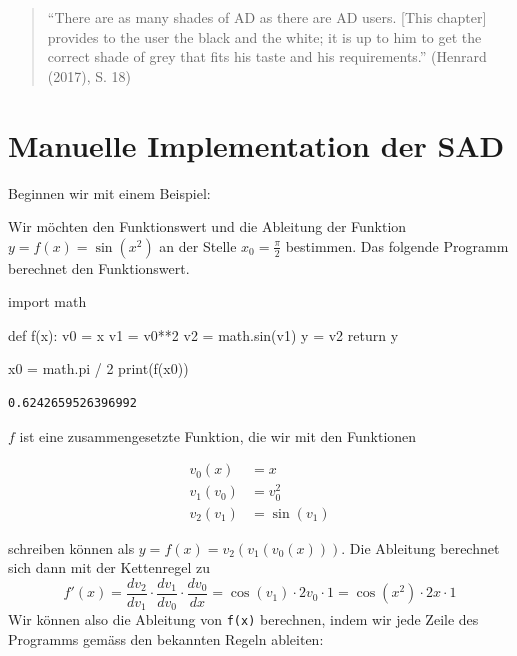 \documentclass[
  a4paper,
  DIV=11]{scrreprt}
\newenvironment{Shaded}{\begin{snugshade}}{\end{snugshade}}
\newcommand{\BuiltInTok}[1]{\textcolor[rgb]{0.00,0.23,0.31}{#1}}
\newcommand{\ControlFlowTok}[1]{\textcolor[rgb]{0.00,0.23,0.31}{#1}}
\newcommand{\DecValTok}[1]{\textcolor[rgb]{0.68,0.00,0.00}{#1}}
\newcommand{\ImportTok}[1]{\textcolor[rgb]{0.00,0.46,0.62}{#1}}
\newcommand{\KeywordTok}[1]{\textcolor[rgb]{0.00,0.23,0.31}{#1}}
\newcommand{\NormalTok}[1]{\textcolor[rgb]{0.00,0.23,0.31}{#1}}
\newcommand{\OperatorTok}[1]{\textcolor[rgb]{0.37,0.37,0.37}{#1}}
\theoremstyle{definition}
\theoremstyle{definition}
\theoremstyle{remark}
\begin{document}
\begin{quote}
``There are as many shades of AD as there are AD users. {[}This
chapter{]} provides to the user the black and the white; it is up to him
to get the correct shade of grey that fits his taste and his
requirements.'' (Henrard (2017), S. 18)
\end{quote}

\hypertarget{sec-SadManualImplementation}{%
\section{Manuelle Implementation der
SAD}\label{sec-SadManualImplementation}}

Beginnen wir mit einem Beispiel:

Wir möchten den Funktionswert und die Ableitung der Funktion
\(y=f(x)=\sin(x^2)\) an der Stelle \(x_0=\frac{\pi}{2}\) bestimmen. Das
folgende Programm berechnet den Funktionswert.

\begin{Shaded}
\begin{Highlighting}[]
\ImportTok{import}\NormalTok{ math}

\KeywordTok{def}\NormalTok{ f(x):}
\NormalTok{    v0 }\OperatorTok{=}\NormalTok{ x}
\NormalTok{    v1 }\OperatorTok{=}\NormalTok{ v0}\OperatorTok{**}\DecValTok{2}
\NormalTok{    v2 }\OperatorTok{=}\NormalTok{ math.sin(v1)}
\NormalTok{    y }\OperatorTok{=}\NormalTok{ v2}
    \ControlFlowTok{return}\NormalTok{ y}

\NormalTok{x0 }\OperatorTok{=}\NormalTok{ math.pi }\OperatorTok{/} \DecValTok{2}
\BuiltInTok{print}\NormalTok{(f(x0))}
\end{Highlighting}
\end{Shaded}

\begin{verbatim}
0.6242659526396992
\end{verbatim}

\(f\) ist eine zusammengesetzte Funktion, die wir mit den Funktionen

\begin{align*}
    v_0(x)   &= x \\
    v_1(v_0) &= v_0 ^2 \\
    v_2(v_1) &= \sin(v_1)
\end{align*}

schreiben können als \(y=f(x)=v_2(v_1(v_0(x)))\). Die Ableitung
berechnet sich dann mit der Kettenregel zu \[
f'(x) = \frac{dv_2}{dv_1} \cdot \frac{dv_1}{dv_0} \cdot \frac{dv_0}{dx} = \cos(v_1)\cdot 2v_0 \cdot 1 = \cos(x^2) \cdot 2x \cdot 1
\] Wir können also die Ableitung von \texttt{f(x)} berechnen, indem wir
jede Zeile des Programms gemäss den bekannten Regeln ableiten:
\end{document}

